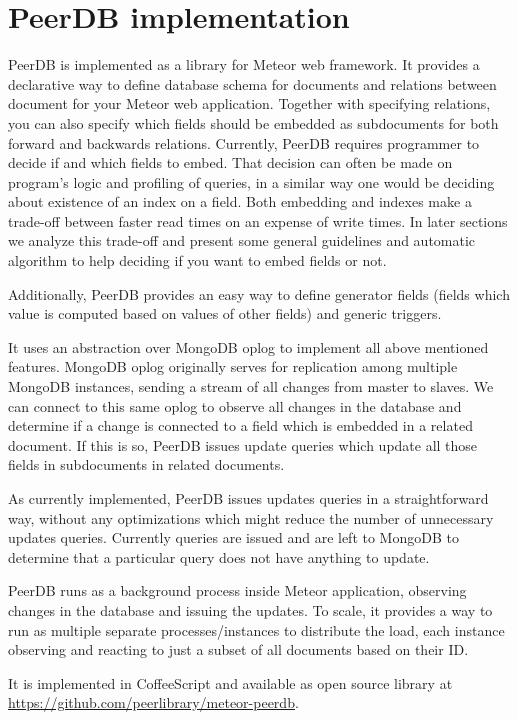 \section{PeerDB implementation}

PeerDB is implemented as a library for Meteor web framework.
It provides a declarative way to define database schema for documents and relations between document for your Meteor web application.
Together with specifying relations, you can also specify which fields should be embedded as subdocuments for both forward and backwards relations.
Currently, PeerDB requires programmer to decide if and which fields to embed.
That decision can often be made on program's logic and profiling of queries, in a similar way one would be deciding about existence of an index on a field.
Both embedding and indexes make a trade-off between faster read times on an expense of write times.
In later sections we analyze this trade-off and present some general guidelines and automatic algorithm to help deciding if you want to embed fields or not.

Additionally, PeerDB provides an easy way to define generator fields (fields which value is computed based on values of other fields) and generic triggers.

It uses an abstraction over MongoDB oplog to implement all above mentioned features.
MongoDB oplog originally serves for replication among multiple MongoDB instances, sending a stream of all changes from master to slaves.
We can connect to this same oplog to observe all changes in the database and determine if a change is connected to a field which is embedded in a related document.
If this is so, PeerDB issues update queries which update all those fields in subdocuments in related documents.

As currently implemented, PeerDB issues updates queries in a straightforward way, without any optimizations which might reduce the number of unnecessary updates queries.
Currently queries are issued and are left to MongoDB to determine that a particular query does not have anything to update.

PeerDB runs as a background process inside Meteor application, observing changes in the database and issuing the updates.
To scale, it provides a way to run as multiple separate processes/instances to distribute the load, each instance observing and reacting to just a subset of all documents based on their ID.

It is implemented in CoffeeScript and available as open source library at \url{https://github.com/peerlibrary/meteor-peerdb}.